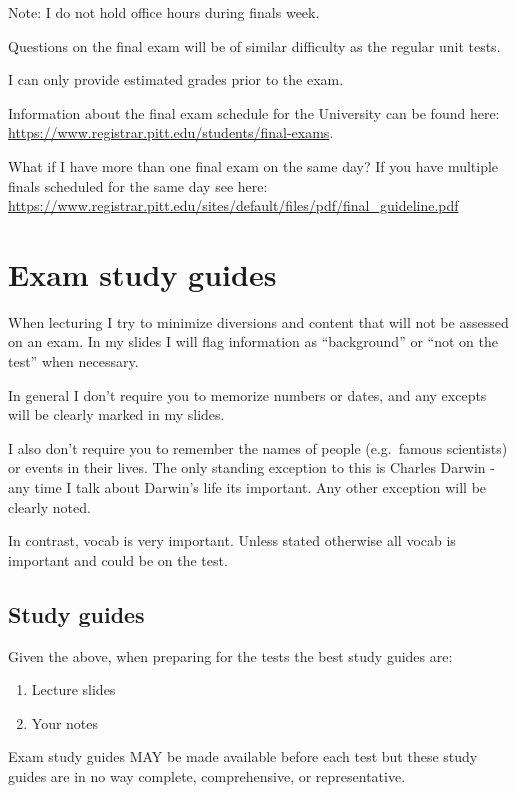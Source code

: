 \documentclass[
]{book}
\providecommand{\tightlist}{%
  \setlength{\itemsep}{0pt}\setlength{\parskip}{0pt}}
\begin{document}
Note: I do not hold office hours during finals week.

Questions on the final exam will be of similar difficulty as the regular unit tests.

I can only provide estimated grades prior to the exam.

Information about the final exam schedule for the University can be found here:
\url{https://www.registrar.pitt.edu/students/final-exams}.

What if I have more than one final exam on the same day?
If you have multiple finals scheduled for the same day see here:
\url{https://www.registrar.pitt.edu/sites/default/files/pdf/final_guideline.pdf}

\hypertarget{exam-study-guides}{%
\chapter{Exam study guides}\label{exam-study-guides}}

When lecturing I try to minimize diversions and content that will not be assessed on an exam. In my slides I will flag information as ``background'' or ``not on the test'' when necessary.

In general I don't require you to memorize numbers or dates, and any excepts will be clearly marked in my slides.

I also don't require you to remember the names of people (e.g.~famous scientists) or events in their lives. The only standing exception to this is Charles Darwin - any time I talk about Darwin's life its important. Any other exception will be clearly noted.

In contrast, vocab is very important. Unless stated otherwise all vocab is important and could be on the test.

\hypertarget{study-guides}{%
\section{Study guides}\label{study-guides}}

Given the above, when preparing for the tests the best study guides are:

\begin{enumerate}
\def\labelenumi{\arabic{enumi}.}
\tightlist
\item
  Lecture slides
\item
  Your notes
\end{enumerate}

Exam study guides MAY be made available before each test but these study guides are in no way complete, comprehensive, or representative.
\end{document}
